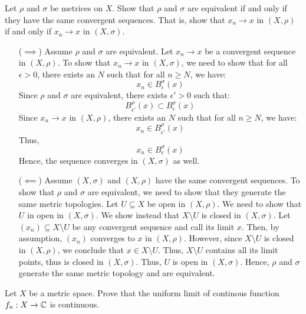 \documentclass[12pt]{article}
\begin{document}
\begin{problab}{5}
    Let $\rho$ and $\sigma$ be metrices on $X$. Show that $\rho$ and $\sigma$ are equivalent if and only if they have the same convergent sequences. That is, show that $x_n \to x$ in $(X, \rho)$ if and only if $x_n \to x$ in $(X, \sigma)$.
\end{problab}

\begin{solu}
    \bbni
    \begin{itemize}
        \item[($\implies$)] Assume $\rho$ and $\sigma$ are equivalent. Let $x_n \to x$ be a convergent sequence in $(X, \rho)$. To show that $x_n \to x$ in $(X, \sigma)$, we need to show that for all $\epsilon > 0$, there exists an $N$ such that for all $n \geq N$, we have:
        \[ x_n \in B_\epsilon^\sigma(x) \]
        Since $\rho$ and $\sigma$ are equivalent, there exists $\epsilon' > 0$ such that: 
        \[ B_{\epsilon'}^\rho(x) \subset B_{\epsilon}^\sigma(x)\]
        Since $x_n \to x$ in $(X, \rho)$, there exists an $N$ such that for all $n \geq N$, we have:
        \[ x_n \in B_{\epsilon'}^\rho(x)\]
        Thus, 
        \[ x_n \in B_{\epsilon}^\sigma(x) \]
        Hence, the sequence converges in $(X, \sigma)$ as well.

        \item[($\impliedby$)] Assume $(X, \sigma)$ and $(X, \rho)$ have the same convergent sequences. To show that $\rho$ and $\sigma$ are equivalent, we need to show that they generate the same metric topologies. Let $U \subseteq X$ be open in $(X, \rho)$. We need to show that $U$ in open in $(X, \sigma)$. \bbni
        We show instead that $X \setminus U$ is closed in $(X, \sigma)$. Let $(x_n) \subseteq X \setminus U$ be any convergent sequence and call its limit $x$. Then, by assumption, $(x_n)$ converges to $x$ in $(X, \rho)$. However, since $X \setminus U$ is closed in $(X, \rho)$, we conclude that $x \in X \setminus U$. Thus, $X \setminus U$ contains all its limit points, thus is closed in $(X, \sigma)$. Thus, $U$ is open in $(X, \sigma)$. Hence, $\rho$ and $\sigma$ generate the same metric topology and are equivalent. 
    \end{itemize}
\end{solu}
\newpage 


\begin{problab}{6} 
    Let $X$ be a metric space. Prove that the uniform limit of continous function $f_n: X \to \mathbb C$ is continuous.
\end{problab}
\end{document}
